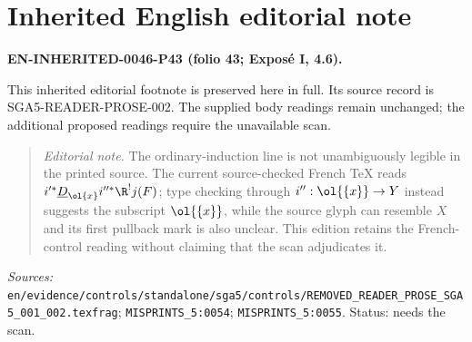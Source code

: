 \section*{Inherited English editorial note}
\begingroup\small
\medskip\noindent\textbf{EN-INHERITED-0046-P43 (folio 43; Exposé I, 4.6).}\par
This inherited editorial footnote is preserved here in full. Its source record is SGA5-READER-PROSE-002. The supplied body readings remain unchanged; the additional proposed readings require the unavailable scan.\par
\begin{quote}
\emph{Editorial note.} The ordinary-induction line is not unambiguously legible in the printed source. The current source-checked French TeX reads $i'^*\underline D_{\ol{x}}i''^*\R^!j(F)$; type checking through $i'':\ol{\{x\}}\to Y$ instead suggests the subscript $\ol{\{x\}}$, while the source glyph can resemble $X$ and its first pullback mark is also unclear. This edition retains the French-control reading without claiming that the scan adjudicates it.
\end{quote}
\noindent\textit{Sources: }\nolinkurl{en/evidence/controls/standalone/sga5/controls/REMOVED_READER_PROSE_SGA5_001_002.texfrag}; \texttt{MISPRINTS\_5:0054}; \texttt{MISPRINTS\_5:0055}. Status: needs the scan.
\endgroup
\clearpage
